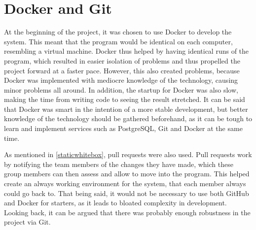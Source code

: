 \section{Docker and Git}
At the beginning of the project, it was chosen to use Docker to develop the system.
This meant that the program would be identical on each computer, resembling a virtual machine.
Docker thus helped by having identical runs of the program, which resulted in easier isolation of problems and thus propelled the project forward at a faster pace.
However, this also created problems, because Docker was implemented with mediocre knowledge of the technology, causing minor problems all around.
In addition, the startup for Docker was also slow, making the time from writing code to seeing the result stretched.
It can be said that Docker was smart in the intention of a more stable development, but better knowledge of the technology should be gathered beforehand, as it can be tough to learn and implement services such as PostgreSQL, Git and Docker at the same time.

As mentioned in \cref{staticwhitebox}, pull requests were also used.
Pull requests work by notifying the team members of the changes they have made, which these group members can then assess and allow to move into the program.
This helped create an always working environment for the system, that each member always could go back to.
That being said, it would not be necessary to use both GitHub and Docker for starters, as it leads to bloated complexity in development. 
Looking back, it can be argued that there was probably enough robustness in the project via Git.
